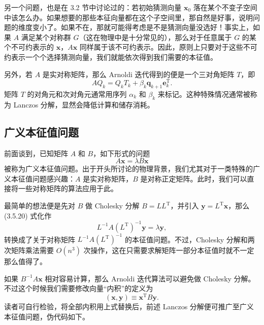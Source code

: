另一个问题，也是在 3.2 节中讨论过的：若初始猜测向量 $\bm x_0$ 落在某个不变子空间中该怎么办。如果想要的那些本征向量都在这个子空间里，那自然是好事，说明问题的维度变小了。如果不在，那就可能得考虑是不是猜测向量没选好！事实上，如果 $A$ 满足某个对称群 $G$（这在物理中是十分常见的），那么对于任意属于 $G$ 的某个不可约表示的 $\bm x$，$A\bm x$ 同样属于该不可约表示。因此，原则上只要对于这些不可约表示一个个选择猜测向量，我们就能依次得到我们需要的本征值。

另外，若 $A$ 是实对称矩阵，那么 Arnoldi 迭代得到的便是一个三对角矩阵 $T$，即
\begin{equation}
AQ_k=Q_kT_k+\beta_k\bm q_{k+1}\bm e_k^{\mathrm T}.
\tag{3.5.19}
\end{equation}
矩阵 $T$ 的对角元和次对角元通常用序列 $\alpha_k$ 和 $\beta_k$ 来标记。这种特殊情况通常被称为 Lanczos 分解，显然会降低计算和储存消耗。

\subsection{广义本征值问题}

前面谈到，已知矩阵 $A$ 和 $B$，如下形式的问题
\begin{equation}
A\bm x=\lambda B\bm x
\tag{3.5.20}
\end{equation}
被称为广义本征值问题。出于开头所讨论的物理背景，我们尤其对于一类特殊的广义本征值问题感兴趣：$A$ 是实对称矩阵，$B$ 是对称正定矩阵。此时，我们可以直接将一些对称矩阵的算法应用于此。

最简单的想法便是先对 $B$ 做 Cholesky 分解 $B=LL^{\mathrm T}$，并引入 $\bm y=L^{\mathrm T}\bm x$，那么 (3.5.20) 式化作
\begin{equation}
L^{-1}A(L^{\mathrm T})^{-1}\bm y=\lambda\bm y,
\tag{3.5.21}
\end{equation}
转换成了关于对称矩阵 $L^{-1}A(L^{\mathrm T})^{-1}$ 的本征值问题。不过，Cholesky 分解和两次矩阵乘法需要 $O(n^3)$ 次操作，这在只需要求解矩阵一部分本征值时就不一定那么值得了。

如果 $B^{-1}A\bm x$ 相对容易计算，那么 Arnoldi 迭代算法可以避免做 Cholesky 分解。不过这个时候我们需要修改向量“内积”的定义为
\begin{equation}
(\bm x,\bm y)\equiv\bm x^{\mathrm T}B\bm y.
\tag{3.5.22}
\end{equation}
读者可自行检验，将全部内积用上式替换后，前述 Lanczos 分解便可推广至广义本征值问题，伪代码如下。

